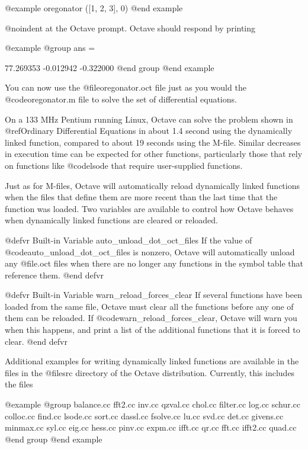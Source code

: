 @example
oregonator ([1, 2, 3], 0)
@end example

@noindent
at the Octave prompt.  Octave should respond by printing

@example
@group
ans =

   77.269353
   -0.012942
   -0.322000
@end group
@end example

You can now use the @file{oregonator.oct} file just as you would the
@code{oregonator.m} file to solve the set of differential equations.

On a 133 MHz Pentium running Linux, Octave can solve the problem shown
in @ref{Ordinary Differential Equations} in about 1.4 second using the
dynamically linked function, compared to about 19 seconds using the
M-file.  Similar decreases in execution time can be expected for other
functions, particularly those that rely on functions like @code{lsode}
that require user-supplied functions.

Just as for M-files, Octave will automatically reload dynamically linked
functions when the files that define them are more recent than the last
time that the function was loaded.  Two variables are available to
control how Octave behaves when dynamically linked functions are cleared
or reloaded.

@defvr {Built-in Variable} auto_unload_dot_oct_files
If the value of @code{auto_unload_dot_oct_files} is nonzero, Octave will
automatically unload any @file{.oct} files when there are no longer any
functions in the symbol table that reference them.
@end defvr

@defvr {Built-in Variable} warn_reload_forces_clear
If several functions have been loaded from the same file, Octave must
clear all the functions before any one of them can be reloaded.  If
@code{warn_reload_forces_clear}, Octave will warn you when this happens,
and print a list of the additional functions that it is forced to clear.
@end defvr

Additional examples for writing dynamically linked functions are
available in the files in the @file{src} directory of the Octave
distribution.  Currently, this includes the files

@example
@group
balance.cc   fft2.cc      inv.cc       qzval.cc
chol.cc      filter.cc    log.cc       schur.cc
colloc.cc    find.cc      lsode.cc     sort.cc 
dassl.cc     fsolve.cc    lu.cc        svd.cc
det.cc       givens.cc    minmax.cc    syl.cc
eig.cc       hess.cc      pinv.cc      
expm.cc      ifft.cc      qr.cc     
fft.cc       ifft2.cc     quad.cc
@end group
@end example

